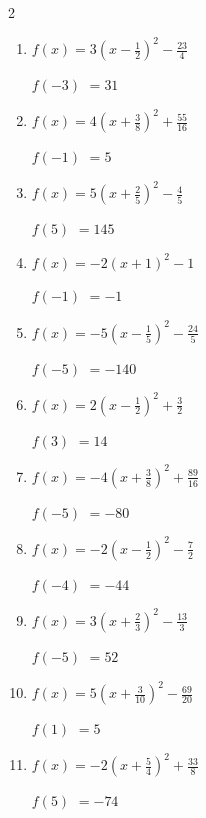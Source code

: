 \begin{multicols}{2}
\begin{enumerate}
$f(2)$
        $=12$

  \item $\displaystyle f(x)=3\left( x-\frac{1}{2}\right)^{2}-\frac{23}{4}$

$f(-3)$
        $=31$

\columnbreak %

  \item $\displaystyle f(x)=4\left( x+\frac{3}{8}\right)^{2}+\frac{55}{16}$

$f(-1)$
        $=5$

  \item $\displaystyle f(x)=5\left( x+\frac{2}{5}\right)^{2}-\frac{4}{5}$

$f(5)$
        $=145$

  \item $\displaystyle f(x)=-2\left( x+1\right)^{2}-1$

$f(-1)$
        $=-1$

  \item $\displaystyle f(x)=-5\left( x-\frac{1}{5}\right)^{2}-\frac{24}{5}$

$f(-5)$
        $=-140$

  \item $\displaystyle f(x)=2\left( x-\frac{1}{2}\right)^{2}+\frac{3}{2}$

$f(3)$
        $=14$

\columnbreak %

\resetques

  \item $\displaystyle f(x)=-4\left( x+\frac{3}{8}\right)^{2}+\frac{89}{16}$

$f(-5)$
        $=-80$

  \item $\displaystyle f(x)=-2\left( x-\frac{1}{2}\right)^{2}-\frac{7}{2}$

$f(-4)$
        $=-44$

  \item $\displaystyle f(x)=3\left( x+\frac{2}{3}\right)^{2}-\frac{13}{3}$

$f(-5)$
        $=52$

  \item $\displaystyle f(x)=5\left( x+\frac{3}{10}\right)^{2}-\frac{69}{20}$

$f(1)$
        $=5$

  \item $\displaystyle f(x)=-2\left( x+\frac{5}{4}\right)^{2}+\frac{33}{8}$

$f(5)$
        $=-74$


\end{enumerate}
\end{multicols}
